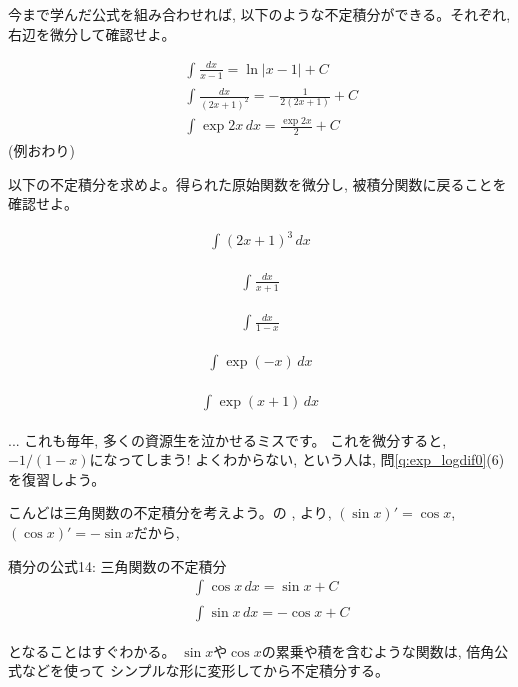 今まで学んだ公式を組み合わせれば, 以下のような不定積分ができる。それぞれ, 右辺を微分して確認せよ。 

\begin{exmpl}
\begin{eqnarray}
&&\int_{}^{} \frac{dx}{x-1}=\ln |x-1|+C\\
&&\int_{}^{} \frac{dx}{(2x+1)^2}=-\frac{1}{2(2x+1)}+C\\
&&\int_{}^{} \exp 2x \,dx=\frac{\exp 2x}{2}+C
\end{eqnarray}
(例おわり)\end{exmpl}
\mv

\begin{q}\label{q:int_4} 以下の不定積分を求めよ。得られた原始関数を微分し, 
被積分関数に戻ることを確認せよ。
\begin{edaenumerate}
\item \begin{eqnarray*}\int_{}^{} (2x+1)^3\, dx\end{eqnarray*}
\item \begin{eqnarray*}\int_{}^{} \frac{dx}{x+1}\end{eqnarray*}
\item \begin{eqnarray*}\int_{}^{} \frac{dx}{1-x}\end{eqnarray*}
\item \begin{eqnarray*}\int_{}^{} \exp(-x)\, dx\end{eqnarray*}
\item \begin{eqnarray*}\int_{}^{} \exp(x+1)\, dx\end{eqnarray*}
\end{edaenumerate}\end{q}

\begin{freqmiss}{\small{}
... これも毎年, 多くの資源生を泣かせるミスです。
これを微分すると, $-1/(1-x)$になってしまう! よくわからない, という人は, 
問\ref{q:exp_logdif0}(6)を復習しよう。}\end{freqmiss}
\mv

こんどは三角関数の不定積分を考えよう。の
, より, 
$(\sin x)'=\cos x$, $(\cos x)'=-\sin x$だから, 

\begin{itembox}{積分の公式14: 三角関数の不定積分}
\begin{eqnarray}
&&\int_{}^{} \cos x \,dx=\sin x+C\\
&&\int_{}^{} \sin x \,dx=-\cos x+C
\end{eqnarray}
\end{itembox}
となることはすぐわかる。
$\sin x$や$\cos x$の累乗や積を含むような関数は, 倍角公式などを使って
シンプルな形に変形してから不定積分する。

